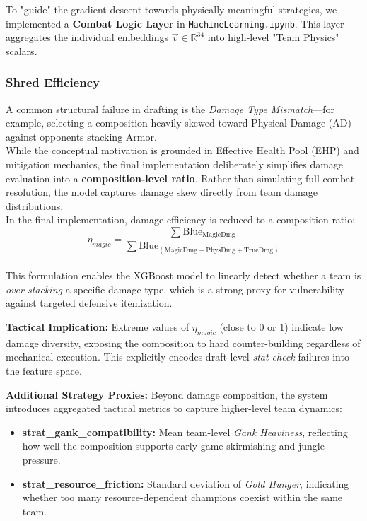 \documentclass[12pt, a4paper]{article}
\begin{document}
    To "guide" the gradient descent towards physically meaningful strategies, we implemented a \textbf{Combat Logic Layer} in \texttt{MachineLearning.ipynb}. This layer aggregates the individual embeddings $\vec{v} \in \mathbb{R}^{34}$ into high-level "Team Physics" scalars.

    \subsubsection{Shred Efficiency}
    A common structural failure in drafting is the \textit{Damage Type Mismatch}—for example, selecting a composition heavily skewed toward Physical Damage (AD) against opponents stacking Armor.\\

    While the conceptual motivation is grounded in Effective Health Pool (EHP) and mitigation mechanics, the final implementation deliberately simplifies damage evaluation into a \textbf{composition-level ratio}. Rather than simulating full combat resolution, the model captures damage skew directly from team damage distributions.\\

    In the final implementation, damage efficiency is reduced to a composition ratio:
    \begin{equation}
        \eta_{magic} = \frac{\sum \text{Blue}_{\text{MagicDmg}}}{\sum \text{Blue}_{(\text{MagicDmg} + \text{PhysDmg} + \text{TrueDmg})}}
    \end{equation}\\

    This formulation enables the XGBoost model to linearly detect whether a team is \textit{over-stacking} a specific damage type, which is a strong proxy for vulnerability against targeted defensive itemization.

    \textbf{Tactical Implication:}
    Extreme values of $\eta_{magic}$ (close to 0 or 1) indicate low damage diversity, exposing the composition to hard counter-building regardless of mechanical execution. This explicitly encodes draft-level \textit{stat check} failures into the feature space.

    \medskip
    \textbf{Additional Strategy Proxies:}
    Beyond damage composition, the system introduces aggregated tactical metrics to capture higher-level team dynamics:

    \begin{itemize}
        \item \textbf{strat\_gank\_compatibility:} Mean team-level \textit{Gank Heaviness}, reflecting how well the composition supports early-game skirmishing and jungle pressure.
        \item \textbf{strat\_resource\_friction:} Standard deviation of \textit{Gold Hunger}, indicating whether too many resource-dependent champions coexist within the same team.
    \end{itemize}
\end{document}

